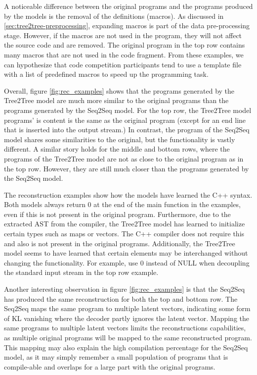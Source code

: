 A noticeable difference between the original programs and the programs produced by the models is the removal of the definitions (macros). 
As discussed in \ref{sec:tree2tree-preprocessing}, expanding macros is part of the data pre-processing stage. However, if the macros are not used in the program, they will not affect the source code and are removed. The original program in the top row contains many macros that are not used in the code fragment. From these examples, we can hypothesize that code competition participants tend to use a template file with a list of predefined macros to speed up the programming task.



Overall, figure \ref{fig:rec_examples} shows that the programs generated by the Tree2Tree model are much more similar to the original programs than the programs generated by the Seq2Seq model. For the top row, the Tree2Tree model programs' is content is the same as the original program (except for an end line that is inserted into the output stream.) In contrast, the program of the Seq2Seq model shares some similarities to the original, but the functionality is vastly different. A similar story holds for the middle and bottom rows, where the programs of the Tree2Tree model are not as close to the original program as in the top row. However, they are still much closer than the programs generated by the Seq2Seq model. 



The reconstruction examples show how the models have learned the C++ syntax. Both models always return 0 at the end of the main function in the examples, even if this is not present in the original program. Furthermore, due to the extracted AST from the compiler, the Tree2Tree model has learned to initialize certain types such as maps or vectors. The C++ compiler does not require this and also is not present in the original programs. Additionally, the Tree2Tree model seems to have learned that certain elements may be interchanged without changing the functionality. For example, use 0 instead of NULL when decoupling the standard input stream in the top row example. 



Another interesting observation in figure \ref{fig:rec_examples} is that the Seq2Seq has produced the same reconstruction for both the top and bottom row. The Seq2Seq maps the same program to multiple latent vectors, indicating some form of KL vanishing where the decoder partly ignores the latent vector. Mapping the same programs to multiple latent vectors limits the reconstructions capabilities, as multiple original programs will be mapped to the same reconstructed program. This mapping may also explain the high compilation percentage for the Seq2Seq model, as it may simply remember a small population of programs that is compile-able and overlaps for a large part with the original programs. 



